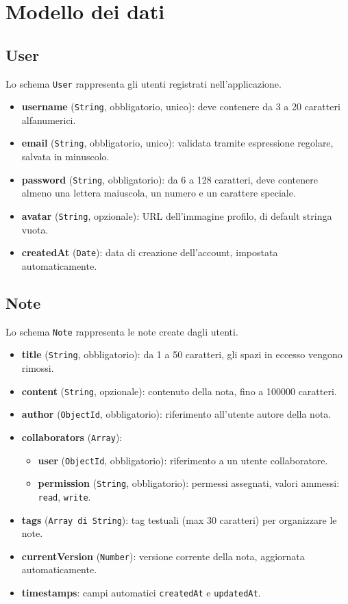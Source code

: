 \documentclass[11pt]{article}
\begin{document}
\newpage

\section{Modello dei dati}

\subsection{User}
Lo schema \texttt{User} rappresenta gli utenti registrati nell’applicazione.  
\begin{itemize}
    \item \textbf{username} (\texttt{String}, obbligatorio, unico): deve contenere da 3 a 20 caratteri alfanumerici. 
    \item \textbf{email} (\texttt{String}, obbligatorio, unico): validata tramite espressione regolare, salvata in minuscolo.
    \item \textbf{password} (\texttt{String}, obbligatorio): da 6 a 128 caratteri, deve contenere almeno una lettera maiuscola, un numero e un carattere speciale.
    \item \textbf{avatar} (\texttt{String}, opzionale): URL dell’immagine profilo, di default stringa vuota.
    \item \textbf{createdAt} (\texttt{Date}): data di creazione dell’account, impostata automaticamente.
\end{itemize}

\subsection{Note}
Lo schema \texttt{Note} rappresenta le note create dagli utenti.  
\begin{itemize}
    \item \textbf{title} (\texttt{String}, obbligatorio): da 1 a 50 caratteri, gli spazi in eccesso vengono rimossi.
    \item \textbf{content} (\texttt{String}, opzionale): contenuto della nota, fino a 100000 caratteri.
    \item \textbf{author} (\texttt{ObjectId}, obbligatorio): riferimento all’utente autore della nota.
    \item \textbf{collaborators} (\texttt{Array}):
        \begin{itemize}
            \item \textbf{user} (\texttt{ObjectId}, obbligatorio): riferimento a un utente collaboratore.
            \item \textbf{permission} (\texttt{String}, obbligatorio): permessi assegnati, valori ammessi: \texttt{read}, \texttt{write}.
        \end{itemize}
    \item \textbf{tags} (\texttt{Array di String}): tag testuali (max 30 caratteri) per organizzare le note.
    \item \textbf{currentVersion} (\texttt{Number}): versione corrente della nota, aggiornata automaticamente.
    \item \textbf{timestamps}: campi automatici \texttt{createdAt} e \texttt{updatedAt}.
\end{itemize}
\end{document}
